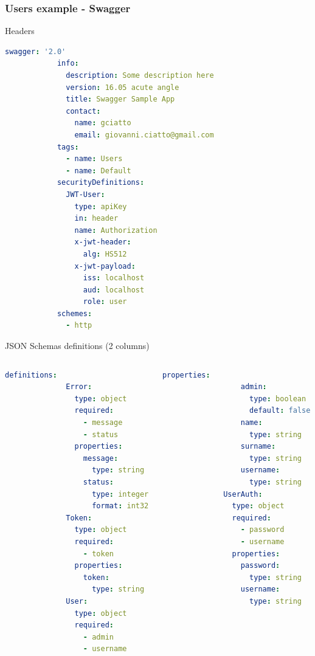 \begin{frame}
	\frametitle{Users example - Swagger}
	\begin{exampleblock}{Headers}
		\begin{lstlisting}[language=yaml,basicstyle=\tiny,linewidth=0.48\textwidth] 
			swagger: '2.0'
			info:
			  description: Some description here
			  version: 16.05 acute angle
			  title: Swagger Sample App
			  contact: 
			    name: gciatto
			    email: giovanni.ciatto@gmail.com
			tags:
			  - name: Users
			  - name: Default  
			securityDefinitions:
			  JWT-User:
			    type: apiKey
			    in: header
			    name: Authorization
			    x-jwt-header:
			      alg: HS512
			    x-jwt-payload:
			      iss: localhost
			      aud: localhost
			      role: user
			schemes:
			  - http
		\end{lstlisting}
	\end{exampleblock}
	
	\begin{exampleblock}{JSON Schemas definitions (2 columns)}
		\begin{columns}
		\begin{column}{0.48\textwidth}
		\begin{lstlisting}[language=yaml,basicstyle=\tiny] 
			definitions:
			  Error:
			    type: object
			    required:
			      - message
			      - status
			    properties:
			      message:
			        type: string
			      status:
			        type: integer
			        format: int32
			  Token:
			    type: object
			    required:
			      - token
			    properties:
			      token:
			        type: string
			  User:
			    type: object
			    required:
			      - admin
			      - username
		\end{lstlisting}
		\end{column}
		\begin{column}{0.48\textwidth}	
		\begin{lstlisting}[language=yaml,basicstyle=\tiny] 
			    properties:
			      admin:
			        type: boolean
			        default: false
			      name:
			        type: string
			      surname:
			        type: string
			      username:
			        type: string
			  UserAuth:
			    type: object
			    required:
			      - password
			      - username
			    properties:
			      password:
			        type: string
			      username:
			        type: string
		\end{lstlisting}
		\end{column}
		\end{columns}
	\end{exampleblock}
	

\end{frame}
